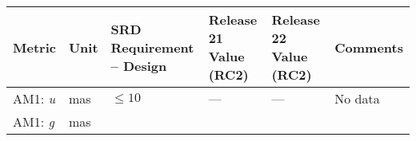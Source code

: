 \documentclass[DM, lsstdraft, toc]{lsstdoc}
\begin{document}
\begin{longtable}[]{@{}llllll@{}}
\toprule
\begin{minipage}[b]{0.12\columnwidth}\raggedright\strut
Metric\strut
\end{minipage} & \begin{minipage}[b]{0.06\columnwidth}\raggedright\strut
Unit\strut
\end{minipage} & \begin{minipage}[b]{0.14\columnwidth}\raggedright\strut
SRD Requirement -- Design\strut
\end{minipage} & \begin{minipage}[b]{0.12\columnwidth}\raggedright\strut
Release 21 Value (RC2)\strut
\end{minipage} & \begin{minipage}[b]{0.12\columnwidth}\raggedright\strut
Release 22 Value (RC2) \strut
\end{minipage} & \begin{minipage}[b]{0.17\columnwidth}\raggedright\strut
Comments\strut
\end{minipage}\tabularnewline
\midrule
\endhead
\begin{minipage}[t]{0.12\columnwidth}\raggedright\strut
AM1: \emph{u}\strut
\end{minipage} & \begin{minipage}[t]{0.06\columnwidth}\raggedright\strut
mas\strut
\end{minipage} & \begin{minipage}[t]{0.14\columnwidth}\raggedright\strut
\(\leq 10\)\strut
\end{minipage} & \begin{minipage}[t]{0.12\columnwidth}\raggedright\strut
---\strut
\end{minipage} & \begin{minipage}[t]{0.12\columnwidth}\raggedright\strut
--- \strut
\end{minipage} & \begin{minipage}[t]{0.17\columnwidth}\raggedright\strut
No data\strut
\end{minipage}\tabularnewline
\begin{minipage}[t]{0.12\columnwidth}\raggedright\strut
AM1: \emph{g}\strut
\end{minipage} & \begin{minipage}[t]{0.06\columnwidth}\raggedright\strut
mas\strut
\end{minipage} & \begin{minipage}[t]{0.14\columnwidth}\raggedright\strut

\end{minipage}
\end{longtable}
\end{document}
